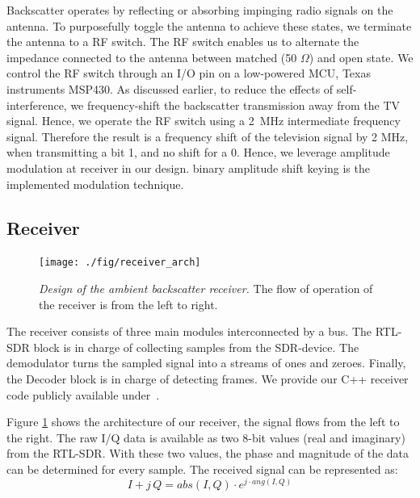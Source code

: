 \documentclass[conference]{IEEEtran}
\begin{document}
Backscatter operates by reflecting or absorbing impinging
radio signals on the antenna. To purposefully toggle the antenna
to achieve these states, we  terminate the antenna to a 
RF switch. The RF switch enables us to alternate the impedance connected to
the antenna between matched (50 \ensuremath{\Omega}) and open state.
We control the RF switch through an I/O pin on a low-powered MCU, Texas
instruments MSP430. As discussed earlier, to reduce the effects of
self-interference, we frequency-shift the backscatter transmission
away from the TV signal. Hence, we operate the RF switch using a 
\SI{2}{\mega\hertz} intermediate frequency signal. Therefore the result 
is a frequency shift of the television signal by 2 MHz, when
transmitting a bit 1, and no shift for a 0.  Hence,  we 
leverage amplitude modulation at receiver in our design.
binary amplitude shift keying is the implemented modulation technique.   
 
\subsection{Receiver}
\begin{figure}[h]
\centering
\texttt{[image: ./fig/receiver\_arch]}
\vspace{-6mm}
\caption{\emph{Design of the ambient backscatter receiver.} The flow of operation of the
receiver is from the left to right.}
\label{fig:receiver_arch}
\vspace{-6mm}
\end{figure}
The receiver consists of three main modules interconnected by a bus. The
RTL-SDR block is in charge of collecting samples from the SDR-device. The
demodulator turns the sampled signal into a streams of ones and zeroes.
Finally, the Decoder block is in charge of detecting frames. We provide our C++
receiver code publicly available under~\cite{s3xm3x_backscatterBASKReceiver}.

Figure \ref{fig:receiver_arch} shows the architecture of our receiver, the
signal flows from the left to the right.
The raw I/Q data is available as two 8-bit values (real and imaginary) from the
RTL-SDR. With these two values, the phase and magnitude of the data can be
determined for every sample. The received signal can be represented as:
\begin{equation}
	I+j\,Q = abs(I,Q) \cdot e^{j \cdot ang(I,Q)} 
\end{equation} 
 
\end{document}
